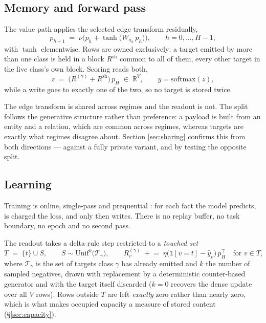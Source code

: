 \documentclass[11pt,a4paper]{article}
\begin{document}
\subsection{Memory and forward pass}

The value path applies the selected edge transform residually,
\begin{equation}
  p_{h+1} \;=\; \nu\!\Big(p_h + \tanh\!\big(W_{a_h}\, p_h\big)\Big),
  \qquad h = 0,\dots,H-1,
  \label{eq:hop}
\end{equation}
with $\tanh$ elementwise. Rows are owned exclusively: a target emitted by more
than one class is held in a block $R^{\mathrm{sh}}$ common to all of them,
every other target in the live class's own block. Scoring reads both,
\begin{equation}
  z \;=\; \big(R^{(\gamma)} + R^{\mathrm{sh}}\big)\, p_H \;\in\; \mathbb{R}^{V},
  \qquad \hat y = \mathrm{softmax}(z),
  \label{eq:logits}
\end{equation}
while a write goes to exactly one of the two, so no target is stored twice.

The edge transform is shared across regimes and the readout is not. The split
follows the generative structure rather than preference: a payload is built
from an entity and a relation, which are common across regimes, whereas targets
are exactly what regimes disagree about. Section \ref{sec:sharing} confirms
this from both directions --- against a fully private variant, and by testing
the opposite split.

\subsection{Learning}

Training is online, single-pass and prequential
\citep{dawid1984present,gama2013evaluating}: for each fact the model predicts,
is charged the loss, and only then writes. There is no replay buffer,
no task boundary, no epoch and no second pass.

The readout takes a delta-rule step restricted to a \emph{touched set}
\begin{equation}
  T \;=\; \{t\} \cup S,
  \qquad
  S \sim \mathrm{Unif}^{k}\big(\mathcal{T}_\gamma\big),
  \qquad
  R^{(\gamma)}_v \;\mathrel{+}=\; \eta\big(\mathbb{1}[v{=}t] - \hat y_v\big)\, p_H^{\top}
  \quad \text{for } v \in T,
  \label{eq:delta}
\end{equation}
where $\mathcal{T}_\gamma$ is the set of targets class $\gamma$ has already
emitted and $k$ the number of sampled negatives, drawn with replacement by a
deterministic counter-based generator and with the target itself discarded
($k=0$ recovers the dense update over all $V$ rows). Rows outside $T$ are left \emph{exactly} zero rather
than nearly zero, which is what makes occupied capacity a measure of stored
content (\S\ref{sec:capacity}).
\end{document}

